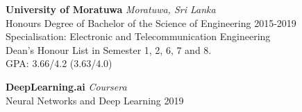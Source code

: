 \documentclass[a4paper,11pt]{article}
\begin{document}
 
{{\bf University of Moratuwa} \hfill {\em Moratuwa, Sri Lanka} 
\\{\normalsize Honours Degree of Bachelor of the Science of Engineering} \hfill
 2015-2019
 \\ \small Specialisation: Electronic and Telecommunication Engineering \hfill $\;$
 \\ Dean's Honour List in Semester 1, 2, 6, 7 and 8. \hfill $\;$
 \\{\normalsize GPA: 3.66/4.2 (3.63/4.0)} \hfill}
 
{{\bf DeepLearning.ai} \hfill {\em Coursera} 
\\{\normalsize Neural Networks and Deep Learning} \hfill
 2019 }
%  




\end{document}
